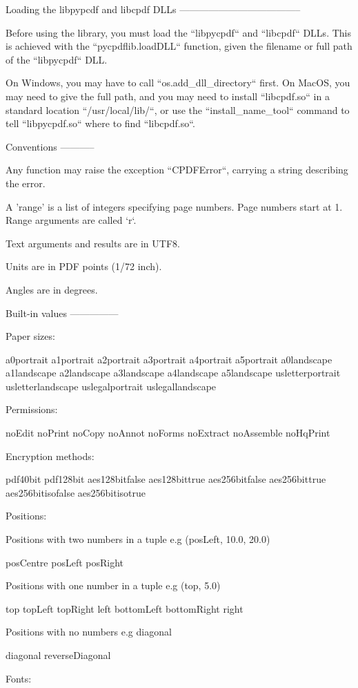 Loading the libpypcdf and libcpdf DLLs
--------------------------------------

Before using the library, you must load the ``libpycpdf`` and ``libcpdf`` DLLs.
This is achieved with the ``pycpdflib.loadDLL`` function, given the filename or
full path of the ``libpycpdf`` DLL.

On Windows, you may have to call ``os.add_dll_directory`` first. On MacOS, you
may need to give the full path, and you may need to install ``libcpdf.so`` in a
standard location ``/usr/local/lib/``, or use the ``install_name_tool`` command
to tell ``libpycpdf.so`` where to find ``libcpdf.so``.

Conventions
-----------

Any function may raise the exception ``CPDFError``, carrying a string describing
the error.

A 'range' is a list of integers specifying page numbers. Page numbers start at
1. Range arguments are called `r`.

Text arguments and results are in UTF8.

Units are in PDF points (1/72 inch).

Angles are in degrees.


Built-in values
---------------

Paper sizes:

a0portrait a1portrait a2portrait a3portrait a4portrait a5portrait a0landscape
a1landscape a2landscape a3landscape a4landscape a5landscape usletterportrait
usletterlandscape uslegalportrait uslegallandscape

Permissions:

noEdit noPrint noCopy noAnnot noForms noExtract noAssemble noHqPrint

Encryption methods:

pdf40bit pdf128bit aes128bitfalse aes128bittrue aes256bitfalse aes256bittrue
aes256bitisofalse aes256bitisotrue

Positions:

Positions with two numbers in a tuple e.g (posLeft, 10.0, 20.0)

posCentre posLeft posRight

Positions with one number in a tuple e.g (top, 5.0)

top topLeft topRight left bottomLeft bottomRight right

Positions with no numbers e.g diagonal

diagonal reverseDiagonal

Fonts:

